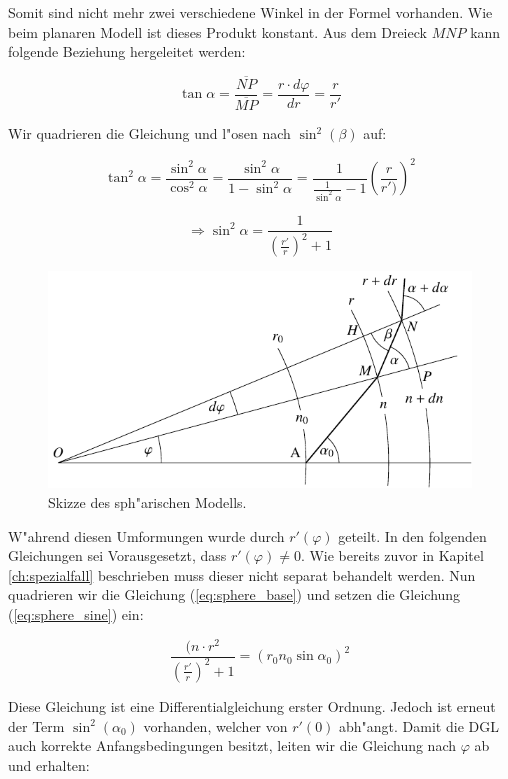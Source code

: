 \begin{refsection}
Somit sind nicht mehr zwei verschiedene Winkel in der Formel vorhanden.
Wie beim planaren Modell ist dieses Produkt konstant.  
Aus dem Dreieck $MNP$ kann folgende Beziehung hergeleitet werden:

$$\tan \alpha =  \frac{\overline{NP}}{\overline{MP}} = \frac{r \cdot d\varphi}{dr} = \frac{r}{r'}$$

Wir quadrieren die Gleichung und l"osen nach $\sin^2(\beta)$ auf:

$$\tan^2 \alpha = \frac{\sin^2\alpha}{\cos^2\alpha} = \frac{\sin^2\alpha}{1-\sin^2\alpha} = \frac{1}{\displaystyle\frac{1}{\sin^2\alpha}-1} \left( \frac{r}{r')} \right)^2$$

\begin{equation} \label{eq:sphere_sine}
\Rightarrow \sin^2\alpha = \frac{1}{\left( \frac{r'}{r} \right)^2 +1}
\end{equation}

\begin{figure} 
\centering
\includegraphics[scale=1]{licht/standalone/fig_sphere_skizze.pdf}
\caption{Skizze des sph"arischen Modells. \label{fig:sphere_skizze}}
\end{figure}

W"ahrend diesen Umformungen wurde durch $r'(\varphi)$ geteilt. 
In den folgenden Gleichungen sei Vorausgesetzt, dass $r'(\varphi) \neq 0$. 
Wie bereits zuvor in Kapitel \ref{ch:spezialfall} beschrieben muss dieser nicht separat behandelt werden.
Nun quadrieren wir die Gleichung (\ref{eq:sphere_base}) und setzen die Gleichung (\ref{eq:sphere_sine}) ein:

$$\frac{(n \cdot r^2}{\displaystyle\left( \frac{r'}{r} \right)^2 +1} = (r_0 n_0 \sin \alpha_0)^2$$

Diese Gleichung ist eine Differentialgleichung erster Ordnung. 
Jedoch ist erneut der Term $\sin^2(\alpha_0)$ vorhanden, welcher von $r'(0)$ abh"angt. 
Damit die DGL auch korrekte Anfangsbedingungen besitzt, leiten wir die Gleichung nach $\varphi$ ab und erhalten:


\end{refsection}
